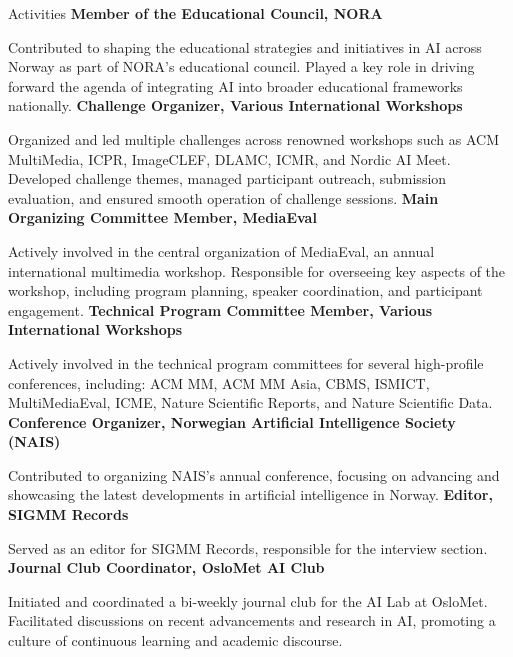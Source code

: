 \begin{rubric}{Activities}
\entry*[2023 -- present]%
\textbf{Member of the Educational Council, NORA} \par 
Contributed to shaping the educational strategies and initiatives in AI across Norway as part of NORA's educational council. Played a key role in driving forward the agenda of integrating AI into broader educational frameworks nationally.
% 
\entry*[2018 -- present]%
\textbf{Challenge Organizer, Various International Workshops} \par
Organized and led multiple challenges across renowned workshops such as ACM MultiMedia, ICPR, ImageCLEF, DLAMC, ICMR, and Nordic AI Meet. Developed challenge themes, managed participant outreach, submission evaluation, and ensured smooth operation of challenge sessions.
%
\entry*[2018 -- present]%
\textbf{Main Organizing Committee Member, MediaEval} \par
Actively involved in the central organization of MediaEval, an annual international multimedia workshop. Responsible for overseeing key aspects of the workshop, including program planning, speaker coordination, and participant engagement.
% 
\entry*[2018 -- present]%
\textbf{Technical Program Committee Member, Various International Workshops} \par
Actively involved in the technical program committees for several high-profile conferences, including: ACM MM, ACM MM Asia, CBMS, ISMICT, MultiMediaEval, ICME, Nature Scientific Reports, and Nature Scientific Data.
%
\entry*[2022]%
\textbf{Conference Organizer, Norwegian Artificial Intelligence Society (NAIS)} \par
Contributed to organizing NAIS's annual conference, focusing on advancing and showcasing the latest developments in artificial intelligence in Norway.
%
\entry*[2019 -- 2023]%
\textbf{Editor, SIGMM Records} \par
Served as an editor for SIGMM Records, responsible for the interview section.
%
\entry*[2019 -- 2020]%
\textbf{Journal Club Coordinator, OsloMet AI Club} \par
Initiated and coordinated a bi-weekly journal club for the AI Lab at OsloMet. Facilitated discussions on recent advancements and research in AI, promoting a culture of continuous learning and academic discourse.
\end{rubric}